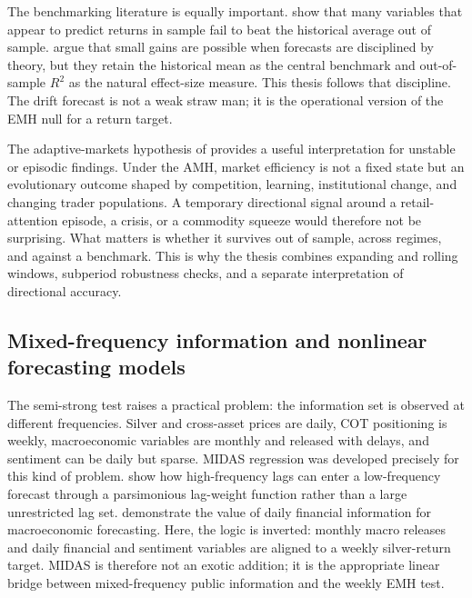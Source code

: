 \documentclass[12pt, a4paper]{article}
\begin{document}
The benchmarking literature is equally important. \textcite{welch2008} show that many
variables that appear to predict returns in sample fail to beat the historical average out
of sample. \textcite{campbell2008} argue that small gains are possible when forecasts are
disciplined by theory, but they retain the historical mean as the central benchmark and
out-of-sample \(R^2\) as the natural effect-size measure. This thesis follows that
discipline. The drift forecast is not a weak straw man; it is the operational version of the
EMH null for a return target.

The adaptive-markets hypothesis of \textcite{lo2004} provides a useful interpretation for
unstable or episodic findings. Under the AMH, market efficiency is not a fixed state but an
evolutionary outcome shaped by competition, learning, institutional change, and changing
trader populations. A temporary directional signal around a retail-attention episode, a
crisis, or a commodity squeeze would therefore not be surprising. What matters is whether it
survives out of sample, across regimes, and against a benchmark. This is why the thesis
combines expanding and rolling windows, subperiod robustness checks, and a separate
interpretation of directional accuracy.

\subsection{Mixed-frequency information and nonlinear forecasting models}

The semi-strong test raises a practical problem: the information set is observed at different
frequencies. Silver and cross-asset prices are daily, COT positioning is weekly,
macroeconomic variables are monthly and released with delays, and sentiment can be daily but
sparse. MIDAS regression was developed precisely for this kind of problem.
\textcite{ghysels2004,ghysels2007} show how high-frequency lags can enter a low-frequency
forecast through a parsimonious lag-weight function rather than a large unrestricted lag
set. \textcite{andreou2013} demonstrate the value of daily financial information for
macroeconomic forecasting. Here, the logic is inverted: monthly macro releases and daily
financial and sentiment variables are aligned to a weekly silver-return target. MIDAS is
therefore not an exotic addition; it is the appropriate linear bridge between
mixed-frequency public information and the weekly EMH test.
\end{document}
